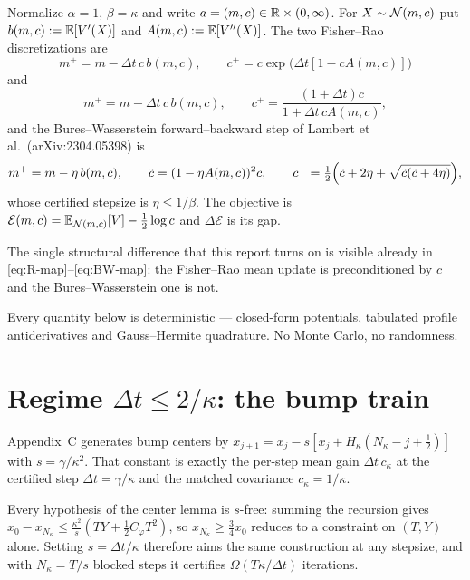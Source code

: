 \documentclass[11pt]{article}
\newcommand{\calE}{\mathcal{E}}
\newcommand{\DeltaE}{\Delta\calE}
\begin{document}
Normalize $\alpha=1$, $\beta=\kappa$ and write $a=(m,c)\in\mathbb{R}\times(0,\infty)$. For
$X\sim\mathcal{N}(m,c)$ put $b(m,c):=\mathbb{E}[V'(X)]$ and $A(m,c):=\mathbb{E}[V''(X)]$. The two Fisher--Rao
discretizations are
\begin{equation}\label{eq:R-map}
    m^+=m-\Delta t\,c\,b(m,c),
    \qquad
    c^+=c\exp\bigl(\Delta t[1-cA(m,c)]\bigr)
\end{equation}
and
\begin{equation}\label{eq:KL-map}
    m^+=m-\Delta t\,c\,b(m,c),
    \qquad
    c^+=\frac{(1+\Delta t)c}{1+\Delta t\,cA(m,c)} ,
\end{equation}
and the Bures--Wasserstein forward--backward step
of Lambert et al.\ (arXiv:2304.05398) is
\begin{equation}\label{eq:BW-map}
    m^+=m-\eta\,b(m,c),
    \qquad
    \tilde c=(1-\eta A(m,c))^2c,
    \qquad
    c^+=\tfrac12\Bigl(\tilde c+2\eta+\sqrt{\tilde c(\tilde c+4\eta)}\Bigr),
\end{equation}
whose certified stepsize is $\eta\le1/\beta$. The objective is
$\calE(m,c)=\E_{\N(m,c)}[V]-\tfrac12\log c$ and $\DeltaE$ is its gap.

The single structural difference that this report turns on is visible already in
\eqref{eq:R-map}--\eqref{eq:BW-map}: the Fisher--Rao mean update is preconditioned by
$c$ and the Bures--Wasserstein one is not.

Every quantity below is deterministic --- closed-form potentials, tabulated profile
antiderivatives and Gauss--Hermite quadrature. No Monte Carlo, no randomness.

\section{Regime $\Delta t\le2/\kappa$: the bump train}
\label{sec:bump}

Appendix~C generates bump centers by
$x_{j+1}=x_j-s[x_j+H_\kappa(N_\kappa-j+\tfrac12)]$ with $s=\gamma/\kappa^2$. That
constant is exactly the per-step mean gain $\Delta t\,c_\kappa$ at the certified step
$\Delta t=\gamma/\kappa$ and the matched covariance $c_\kappa=1/\kappa$.

\begin{remark}
\label{rem:template}
Every hypothesis of the center lemma is $s$-free: summing the recursion gives
$x_0-x_{N_\kappa}\le\frac{\kappa^2}s(TY+\tfrac12C_\varphi T^2)$, so
$x_{N_\kappa}\ge\tfrac34x_0$ reduces to a constraint on $(T,Y)$ alone. Setting
$s=\Delta t/\kappa$ therefore aims the same construction at any stepsize, and with
$N_\kappa=T/s$ blocked steps it certifies $\Omega(T\kappa/\Delta t)$ iterations.
\end{remark}
\end{document}
